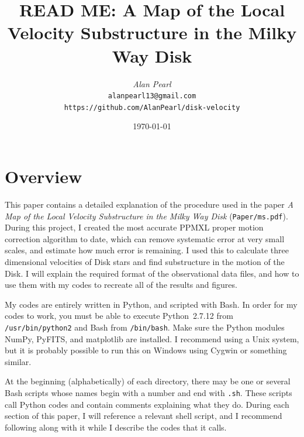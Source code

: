 \documentclass{article}
\begin{document}
\title{\textbf{READ ME:} A Map of the Local Velocity Substructure in the Milky Way Disk}
\author{\textit{Alan Pearl}\\
	\texttt{alanpearl13@gmail.com}\\
	\texttt{https://github.com/AlanPearl/disk-velocity}}
	\date{\today}
\maketitle

\section{Overview}

This paper contains a detailed explanation of the procedure used in the paper \textit{A Map of the Local Velocity Substructure in the Milky Way Disk} (\texttt{Paper/ms.pdf}). During this project, I created the most accurate PPMXL proper motion correction algorithm to date, which can remove systematic error at very small scales, and estimate how much error is remaining. I used this to calculate three dimensional velocities of Disk stars and find substructure in the motion of the Disk. I will explain the required format of the observational data files, and how to use them with my codes to recreate all of the results and figures. 

My codes are entirely written in Python, and scripted with Bash. In order for my codes to work, you must be able to execute Python~2.7.12 from \texttt{/usr/bin/python2} and Bash from \texttt{/bin/bash}. Make sure the Python modules NumPy, PyFITS, and matplotlib are installed. I recommend using a Unix system, but it is probably possible to run this on Windows using Cygwin or something similar.

At the beginning (alphabetically) of each directory, there may be one or several Bash scripts whose names begin with a number and end with \texttt{.sh}. These scripts call Python codes and contain comments explaining what they do. During each section of this paper, I will reference a relevant shell script, and I recommend following along with it while I describe the codes that it calls.
\end{document}
